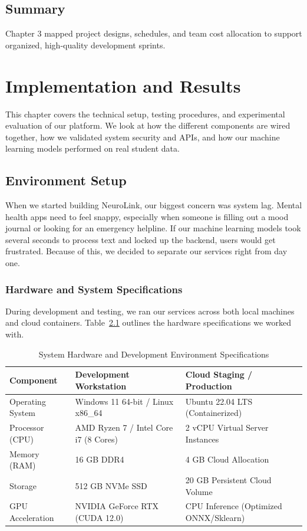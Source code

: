 \documentclass[a4paper,11pt]{report}
\begin{document}
\section{Summary}
Chapter 3 mapped project designs, schedules, and team cost allocation to support organized, high-quality development sprints.

\chapter{Implementation and Results}

This chapter covers the technical setup, testing procedures, and experimental evaluation of our platform. We look at how the different components are wired together, how we validated system security and APIs, and how our machine learning models performed on real student data.

\section{Environment Setup}
When we started building NeuroLink, our biggest concern was system lag. Mental health apps need to feel snappy, especially when someone is filling out a mood journal or looking for an emergency helpline. If our machine learning models took several seconds to process text and locked up the backend, users would get frustrated. Because of this, we decided to separate our services right from day one.

\subsection{Hardware and System Specifications}
During development and testing, we ran our services across both local machines and cloud containers. Table~\ref{tab:env_hardware} outlines the hardware specifications we worked with.

\begin{table}[H]
\centering
\caption{System Hardware and Development Environment Specifications}
\label{tab:env_hardware}
\begin{tabular}{lll}
\toprule
\textbf{Component} & \textbf{Development Workstation} & \textbf{Cloud Staging / Production} \\
\midrule
Operating System   & Windows 11 64-bit / Linux x86\_64 & Ubuntu 22.04 LTS (Containerized) \\
Processor (CPU)    & AMD Ryzen 7 / Intel Core i7 (8 Cores) & 2 vCPU Virtual Server Instances \\
Memory (RAM)       & 16 GB DDR4                       & 4 GB Cloud Allocation \\
Storage            & 512 GB NVMe SSD                  & 20 GB Persistent Cloud Volume \\
GPU Acceleration   & NVIDIA GeForce RTX (CUDA 12.0)   & CPU Inference (Optimized ONNX/Sklearn) \\
\bottomrule
\end{tabular}
\end{table}
\end{document}
